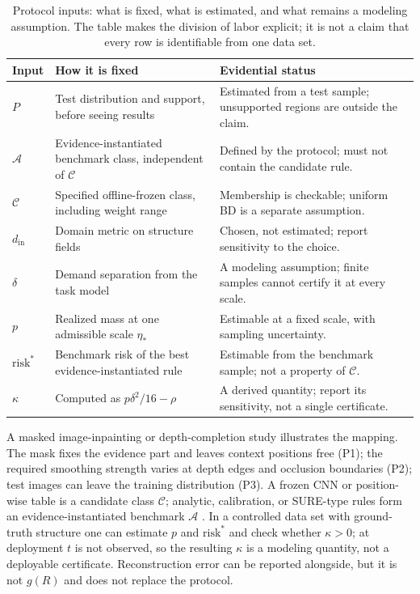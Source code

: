 \documentclass[twoside,11pt]{article}
\begin{document}
\begin{table}[!ht]
\caption{Protocol inputs: what is fixed, what is estimated, and what remains a modeling assumption. The table makes the division of labor explicit; it is not a claim that every row is identifiable from one data set.}
\label{tab:protocol}
\centering
\small
\begin{tabular}{@{}>{\raggedright\arraybackslash}p{}>{\raggedright\arraybackslash}p{}>{\raggedright\arraybackslash}p{}@{}}
\hline
\textbf{Input} & \textbf{How it is fixed} & \textbf{Evidential status}\\
\hline
$P$ & Test distribution and support, before seeing results & Estimated from a test sample; unsupported regions are outside the claim.\\
$\mathcal{A}$ & Evidence-instantiated benchmark class, independent of $\mathcal{C}$ & Defined by the protocol; must not contain the candidate rule.\\
$\mathcal{C}$ & Specified offline-frozen class, including weight range & Membership is checkable; uniform BD is a separate assumption.\\
$d_{\mathrm{in}}$ & Domain metric on structure fields & Chosen, not estimated; report sensitivity to the choice.\\
$\delta$ & Demand separation from the task model & A modeling assumption; finite samples cannot certify it at every scale.\\
$p$ & Realized mass at one admissible scale $\eta_*$ & Estimable at a fixed scale, with sampling uncertainty.\\
$\mathrm{risk}^*$ & Benchmark risk of the best evidence-instantiated rule & Estimable from the benchmark sample; not a property of $\mathcal{C}$.\\
$\kappa$ & Computed as $p\delta^2/16-\rho$ & A derived quantity; report its sensitivity, not a single certificate.\\
\hline
\end{tabular}
\end{table}

A masked image-inpainting or depth-completion study illustrates the mapping. The mask fixes the evidence part and leaves context positions free (P1); the required smoothing strength varies at depth edges and occlusion boundaries (P2); test images can leave the training distribution (P3). A frozen CNN or position-wise table is a candidate class $\mathcal{C}$; analytic, calibration, or SURE-type rules form an evidence-instantiated benchmark $\mathcal{A}$ \citep{stein1981,romano2017}. In a controlled data set with ground-truth structure one can estimate $p$ and $\mathrm{risk}^*$ and check whether $\kappa>0$; at deployment $t$ is not observed, so the resulting $\kappa$ is a modeling quantity, not a deployable certificate. Reconstruction error can be reported alongside, but it is not $g(R)$ and does not replace the protocol.
\end{document}
